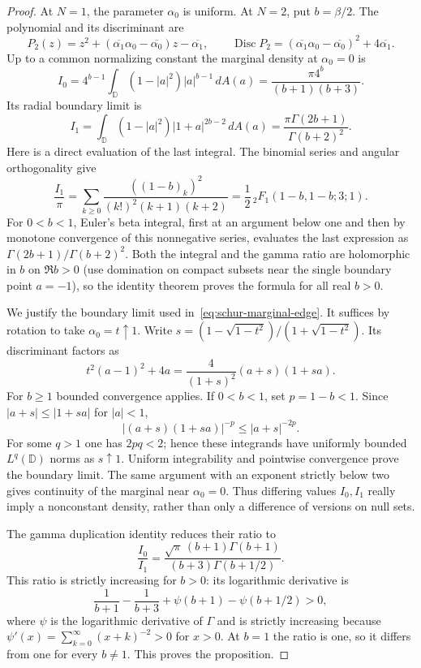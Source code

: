 \documentclass[11pt,a4paper]{article}
\numberwithin{equation}{section}
\theoremstyle{definition}
\theoremstyle{remark}
\begin{document}
\begin{proof}
At $N=1$, the parameter $\alpha_0$ is uniform. At $N=2$, put $b=\beta/2$.
The polynomial and its discriminant are
\[
 P_2(z)=z^2+(\overline{\alpha_1}\alpha_0-
            \overline{\alpha_0})z-\overline{\alpha_1},\qquad
 \operatorname{Disc}P_2=
 (\overline{\alpha_1}\alpha_0-\overline{\alpha_0})^2
       +4\overline{\alpha_1}.
\]
Up to a common normalizing constant the marginal density at
$\alpha_0=0$ is
\begin{equation}
 I_0=4^{b-1}\int_{\mathbb D}(1-|a|^2)|a|^{b-1}\,dA(a)
 =\frac{\pi4^b}{(b+1)(b+3)}.
 \label{eq:schur-marginal-center}
\end{equation}
Its radial boundary limit is
\begin{equation}
 I_1=\int_{\mathbb D}(1-|a|^2)|1+a|^{2b-2}\,dA(a)
 =\frac{\pi\Gamma(2b+1)}{\Gamma(b+2)^2}.
 \label{eq:schur-marginal-edge}
\end{equation}
Here is a direct evaluation of the last integral. The binomial series
and angular orthogonality give
\[
 \frac{I_1}{\pi}
 =\sum_{k\ge0}\frac{((1-b)_k)^2}{(k!)^2(k+1)(k+2)}
 =\frac12\,{}_2F_1(1-b,1-b;3;1).
\]
For $0<b<1$, Euler's beta integral, first at an argument below one
and then by monotone convergence of this nonnegative series, evaluates
the last expression as
$\Gamma(2b+1)/\Gamma(b+2)^2$. Both the integral and the gamma ratio
are holomorphic in $b$ on $\Re b>0$ (use domination on compact
subsets near the single boundary point $a=-1$), so the identity
theorem proves the formula for all real $b>0$.

We justify the boundary limit used in~\eqref{eq:schur-marginal-edge}.
It suffices by rotation to take $\alpha_0=t\uparrow1$. Write
$s=(1-\sqrt{1-t^2})/(1+\sqrt{1-t^2})$. Its discriminant factors as
\[
 t^2(a-1)^2+4a=\frac4{(1+s)^2}(a+s)(1+sa).
\]
For $b\ge1$ bounded convergence applies. If $0<b<1$, set $p=1-b<1$.
Since $|a+s|\le|1+sa|$ for $|a|<1$,
\[
 |(a+s)(1+sa)|^{-p}\le|a+s|^{-2p}.
\]
For some $q>1$ one has $2pq<2$; hence these integrands have uniformly
bounded $L^q(\mathbb D)$ norms as $s\uparrow1$. Uniform integrability
and pointwise convergence prove the boundary limit. The same
argument with an exponent strictly below two gives continuity of
the marginal near $\alpha_0=0$. Thus differing values $I_0,I_1$
really imply a nonconstant density, rather than only a difference
of versions on null sets.

The gamma duplication identity reduces their ratio to
\[
 \frac{I_0}{I_1}
 =\frac{\sqrt\pi\,(b+1)\Gamma(b+1)}{(b+3)\Gamma(b+1/2)}.
\]
This ratio is strictly increasing for $b>0$: its logarithmic
 derivative is
\[
 \frac1{b+1}-\frac1{b+3}+\psi(b+1)-\psi(b+1/2)>0,
\]
where $\psi$ is the logarithmic derivative of $\Gamma$ and is strictly
increasing because
$\psi'(x)=\sum_{k=0}^\infty(x+k)^{-2}>0$ for $x>0$.
At $b=1$ the ratio is one, so it differs from one for every
$b\ne1$. This proves the proposition.
\end{proof}
\end{document}
